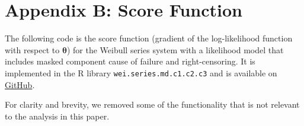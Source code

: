 \documentclass[
]{article}
\begin{document}
\hypertarget{appendix-b-score-function}{%
\section*{Appendix B: Score Function}\label{appendix-b-score-function}}

\label{app:score-code}

The following code is the score function (gradient of the log-likelihood
function with respect to \(\boldsymbol{\theta}\)) for the Weibull series
system with a likelihood model that includes masked component cause of
failure and right-censoring. It is implemented in the R library
\texttt{wei.series.md.c1.c2.c3} and is available on
\href{https://github.com/queelius/wei.series.md.c1.c2.c3}{GitHub}.

For clarity and brevity, we removed some of the functionality that is
not relevant to the analysis in this paper.
\end{document}
